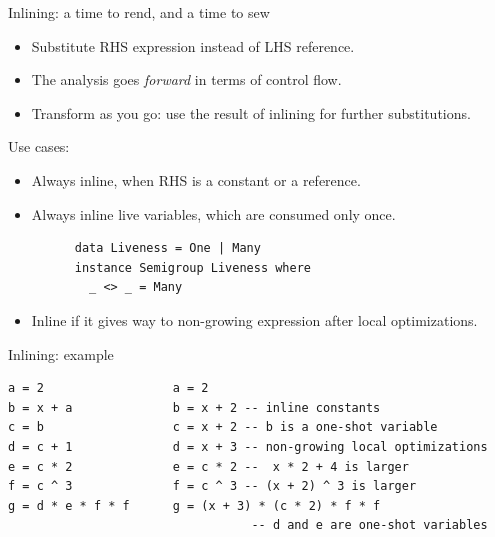 \documentclass[handout]{beamer}
\begin{document}
\begin{frame}[fragile]{Inlining: a time to rend, and a time to sew}

\begin{itemize}
\item Substitute RHS expression instead of LHS reference.
\item The analysis goes {\em forward} in terms of control flow.
\item Transform as you go: use the result of inlining for further substitutions.
\end{itemize}

Use cases:

\begin{itemize}
\item Always inline, when RHS is a constant or a reference.
\item Always inline live variables, which are consumed only once.
      \begin{lstlisting}
      data Liveness = One | Many
      instance Semigroup Liveness where
        _ <> _ = Many
      \end{lstlisting}
\item Inline if it gives way to non-growing expression after local optimizations.
\end{itemize}

\end{frame}

\begin{frame}[fragile]{Inlining: example}
\begin{adjustwidth}{-1.5em}{-1.5em}

\begin{lstlisting}
a = 2                  a = 2
b = x + a              b = x + 2 -- inline constants
c = b                  c = x + 2 -- b is a one-shot variable
d = c + 1              d = x + 3 -- non-growing local optimizations
e = c * 2              e = c * 2 --  x * 2 + 4 is larger
f = c ^ 3              f = c ^ 3 -- (x + 2) ^ 3 is larger
g = d * e * f * f      g = (x + 3) * (c * 2) * f * f
                                  -- d and e are one-shot variables
\end{lstlisting}

\end{adjustwidth}
\end{frame}
\end{document}
